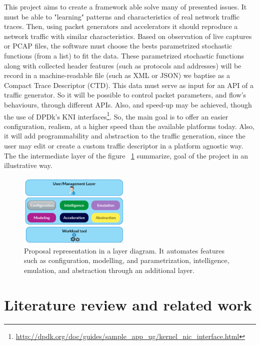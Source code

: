 This project aims to create a framework able solve many of presented issues.  It must be able to "learning" patterns and characteristics of real network traffic traces. Then, using packet generators and accelerators it should reproduce a network traffic with similar  characteristics. Based on observation of live captures or PCAP files, the software must choose the bests parametrized stochastic functions (from a list) to fit the data. These parametrized stochastic functions along with collected header features (such as protocols and addresses) will be record in a machine-readable file (such as XML or JSON) we baptise as a Compact Trace Descriptor (CTD). This data must serve as input for an API of a traffic generator. So it will be possible to control packet parameters, and flow's behaviours, through different APIs. Also, and speed-up may be achieved, though the use of DPDk's KNI interfaces\footnote{ \url{http://dpdk.org/doc/guides/sample_app_ug/kernel_nic_interface.html} }. So, the main goal is to offer an easier configuration, realism, at a higher speed than the available platforms today. Also, it will add programmability and abstraction to the traffic generation, since the user may edit or create a custom traffic descriptor in a platform agnostic way. The the intermediate layer of the figure ~\ref{fig:arquitetura-layer} summarize, goal of the project in an illustrative way.

\begin{figure}[H]
        {\centering
        \includegraphics[height=35mm]{figures/arquitetura-layer.png}
        \caption{Proposal representation in a layer diagram. It automates features such as configuration, modelling, and parametrization, intelligence, emulation, and abstraction through an additional layer.}
        \label{fig:arquitetura-layer}\par}
\end{figure}

\section{Literature review and related work}
\label{sec:literature-review}

